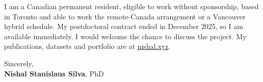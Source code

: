\documentclass[11pt]{article}
\newcommand{\clName}{Nishal Stanislaus Silva}
\newcommand{\clSite}{https://nishal.xyz}
\begin{document}
I am a Canadian permanent resident, eligible to work without sponsorship, based in Toronto and able to work the remote-Canada arrangement or a Vancouver hybrid schedule. My postdoctoral contract ended in December 2025, so I am available immediately. I would welcome the chance to discuss the project. My publications, datasets and portfolio are at \href{\clSite}{nishal.xyz}.

\vspace{10pt}
Sincerely,\\[2pt]
\textbf{\clName}, PhD
\end{document}
